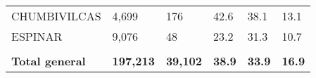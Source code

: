 \begin{tabular}{llllll}
	\cellcolor[HTML]{F8CBAD}CHUMBIVILCAS                           & 4,699                                                                 & 176                                                              & 42.6                                                                             & 38.1                                                                        & 13.1                                                                                \\
	\cellcolor[HTML]{F8CBAD}ESPINAR                                & 9,076                                                                 & 48                                                               & 23.2                                                                             & 31.3                                                                        & 10.7                                                                                \\
	&                                                                       &                                                                  &                                                                                  &                                                                             &                                                                                     \\
	\rowcolor[HTML]{DDEBF7} 
	\textbf{Total   general}                                       & \textbf{197,213}                                                      & \textbf{39,102}                                                  & \textbf{38.9}                                                                    & \textbf{33.9}                                                               & \textbf{16.9}                                                                      
\end{tabular}